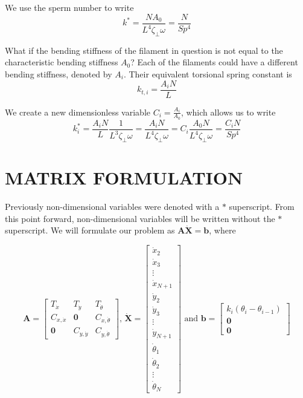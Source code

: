 \documentclass[12pt,letterpaper,titlepage]{article}
\begin{document}
We use the sperm number to write
\begin{equation}
k^* = \frac{NA_0}{L^4 \zeta_{\bot} \omega} = \frac{N}{Sp^4}
\end{equation}

What if the bending stiffness of the filament in question is not equal to the characteristic bending stiffness $A_0$? Each of the filaments could have a different bending stiffness, denoted by $A_i$. Their equivalent torsional spring constant is
\begin{equation}
k_{t,i} = \frac{A_i N}{L}
\end{equation}

We create a new dimensionless variable $C_i = \frac{A_i}{A_0}$, which allows us to write
\begin{equation}
k_i^* = \frac{A_i N}{L} \frac{1}{L^3 \zeta_{\bot} \omega} = \frac{A_i N}{L^4 \zeta_{\bot} \omega} = C_i \frac{A_0 N}{L^4 \zeta_{\bot} \omega} = \frac{C_i N}{Sp^4}
\end{equation}

\newpage
\section{MATRIX FORMULATION}
Previously non-dimensional variables were denoted with a $*$ superscript. From this point forward, non-dimensional variables will be written without the $*$ superscript. We will formulate our problem as $\mathbf{A} \mathbf{\dot{X}} = \mathbf{b}$, where

\[\mathbf{A} = \begin{bmatrix}
T_{\dot{x}}&T_{\dot{y}}&T_{\dot{\theta}}\\
C_{x,\dot{x}}&\mathbf{0}&C_{x,\dot{\theta}}\\
\mathbf{0}&C_{y,\dot{y}}&C_{y,\dot{\theta}}
\end{bmatrix}
\text{, }
\mathbf{\dot{X}} = \begin{bmatrix}
\dot{x}_2\\
\dot{x}_3\\
\vdots \\
\dot{x}_{N+1}\\
\dot{y}_2\\
\dot{y}_3\\
\vdots \\
\dot{y}_{N+1}\\
\dot{\theta}_1\\
\dot{\theta}_2\\
\vdots \\
\dot{\theta}_N
\end{bmatrix}
\text{ and }
\mathbf{b} = \begin{bmatrix}
k_i (\theta_i - \theta_{i-1})\\
\mathbf{0}\\
\mathbf{0}
\end{bmatrix}
\]
\end{document}
